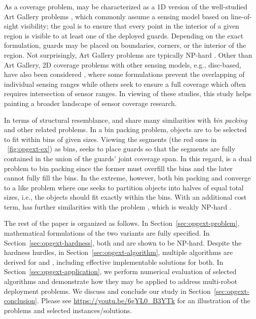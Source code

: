 As a coverage problem, \opg may be characterized as a 1D version 
of the well-studied Art Gallery problems  \cite{o1987art,shermer1992recent},
which commonly assume a sensing model based on line-of-sight 
visibility\cite{lozano1979algorithm}; the goal is to ensure that every point
in the  interior of a given region is visible to at least one of the deployed 
guards. Depending on the exact formulation, guards may be placed on 
boundaries, corners, or the interior of the region. Not surprisingly, Art
Gallery problems are typically NP-hard \cite{lee1986computational}. Other
than Art Gallery, 2D coverage problems with other sensing models, e.g., 
disc-based, have also been considered \cite{thue1910dichteste,hales2005proof,
drezner1995facility,cortes2004coverage,pavone2009equitable,
pierson2017adapting}, where some formulations prevent the overlapping 
of individual sensing ranges \cite{thue1910dichteste,hales2005proof} while 
others seek to ensure a full coverage which often requires intersection
of sensor ranges. 
%
In viewing of these studies, this study helps painting a broader landscape 
of sensor coverage research.

In terms of structural resemblance, \opglr and \opgmc share many similarities 
with {\em bin packing}  \cite{johnson1973near} and other related problems. 
In a bin packing problem, objects are to be selected to fit within bins of 
given sizes. Viewing the segments (the red ones in ~\ref{fig:opgext-ex}) as 
bins, \opg seeks to place guards so that the segments are fully contained in 
the union of the guards' joint coverage span. In this regard, \opg is a dual
problem to bin packing since the former must overfill the bins and the later 
cannot fully fill the bins. In the extreme, however, both bin packing and 
\opg converge to a \subsetsum \cite{karp1972reducibility} like problem where 
one seeks to partition objects into halves of equal total sizes, i.e., the 
objects should fit exactly within the bins. With an additional cost term, 
\opgmc has further similarities with the \ttkp problem \cite{lueker1975two}, 
which is weakly NP-hard \cite{dantzig1957discrete}.

The rest of the paper is organized as follows. In Section~\ref{sec:opgext-problem},
mathematical formulations of the two \opg variants are fully specified. In
Section~\ref{sec:opgext-hardness}, both \opglr and \opgmc are shown to be 
NP-hard. Despite the hardness hurdles, in Section~\ref{sec:opgext-algorithm}, 
multiple algorithms are derived for \opglr and \opgmc, including effective
implementable solutions for both. In Section~\ref{sec:opgext-application},
we perform numerical evaluation of selected algorithms and demonstrate 
how they may be applied to address multi-robot deployment problems. We 
discuss and conclude our study in Section~\ref{sec:opgext-conclusion}. Please
see \url{https://youtu.be/6gYL0_B3YTk} for an illustration of the problems 
and selected instances/solutions. 